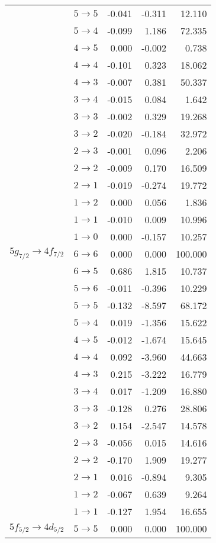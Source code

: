 \begin{longtable}{cc|rrr}
 & $5 \rightarrow 5$ &-0.041&-0.311&12.110\\
 & $5 \rightarrow 4$ &-0.099&1.186&72.335\\
 & $4 \rightarrow 5$ &0.000&-0.002&0.738\\
 & $4 \rightarrow 4$ &-0.101&0.323&18.062\\
 & $4 \rightarrow 3$ &-0.007&0.381&50.337\\
 & $3 \rightarrow 4$ &-0.015&0.084&1.642\\
 & $3 \rightarrow 3$ &-0.002&0.329&19.268\\
 & $3 \rightarrow 2$ &-0.020&-0.184&32.972\\
 & $2 \rightarrow 3$ &-0.001&0.096&2.206\\
 & $2 \rightarrow 2$ &-0.009&0.170&16.509\\
 & $2 \rightarrow 1$ &-0.019&-0.274&19.772\\
 & $1 \rightarrow 2$ &0.000&0.056&1.836\\
 & $1 \rightarrow 1$ &-0.010&0.009&10.996\\
 & $1 \rightarrow 0$ &0.000&-0.157&10.257\\[4pt]
$5g_{7/2} \rightarrow 4f_{7/2}$ & $6 \rightarrow 6$ &0.000&0.000&100.000\\
 & $6 \rightarrow 5$ &0.686&1.815&10.737\\
 & $5 \rightarrow 6$ &-0.011&-0.396&10.229\\
 & $5 \rightarrow 5$ &-0.132&-8.597&68.172\\
 & $5 \rightarrow 4$ &0.019&-1.356&15.622\\
 & $4 \rightarrow 5$ &-0.012&-1.674&15.645\\
 & $4 \rightarrow 4$ &0.092&-3.960&44.663\\
 & $4 \rightarrow 3$ &0.215&-3.222&16.779\\
 & $3 \rightarrow 4$ &0.017&-1.209&16.880\\
 & $3 \rightarrow 3$ &-0.128&0.276&28.806\\
 & $3 \rightarrow 2$ &0.154&-2.547&14.578\\
 & $2 \rightarrow 3$ &-0.056&0.015&14.616\\
 & $2 \rightarrow 2$ &-0.170&1.909&19.277\\
 & $2 \rightarrow 1$ &0.016&-0.894&9.305\\
 & $1 \rightarrow 2$ &-0.067&0.639&9.264\\
 & $1 \rightarrow 1$ &-0.127&1.954&16.655\\[4pt]
$5f_{5/2} \rightarrow 4d_{5/2}$ & $5 \rightarrow 5$ &0.000&0.000&100.000\\

\end{longtable}
